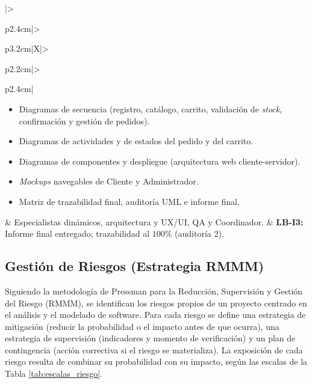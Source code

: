 {\begin{xltabular}{\textwidth}{|>{\raggedright\arraybackslash}p{2.4cm}|>{\raggedright\arraybackslash}p{3.2cm}|X|>{\raggedright\arraybackslash}p{2.2cm}|>{\raggedright\arraybackslash}p{2.4cm}|}
    \begin{itemize}[leftmargin=*, nosep]
        \item Diagramas de secuencia (registro, catálogo, carrito, validación de \textit{stock}, confirmación y gestión de pedidos).
        \item Diagramas de actividades y de estados del pedido y del carrito.
        \item Diagramas de componentes y despliegue (arquitectura web cliente-servidor).
        \item \textit{Mockups} navegables de Cliente y Administrador.
        \item Matriz de trazabilidad final, auditoría UML e informe final.
    \end{itemize} & Especialistas dinámicos, arquitectura y UX/UI, QA y Coordinador. & \textbf{LB-I3:} Informe final entregado; trazabilidad al $100\%$ (auditoría 2). \\
    \hline
\end{xltabular}
}


\subsection{Gestión de Riesgos (Estrategia RMMM)}

Siguiendo la metodología de Pressman para la Reducción, Supervisión y Gestión del Riesgo (RMMM), se identifican los riesgos propios de un proyecto centrado en el análisis y el modelado de software. Para cada riesgo se define una estrategia de mitigación (reducir la probabilidad o el impacto antes de que ocurra), una estrategia de supervisión (indicadores y momento de verificación) y un plan de contingencia (acción correctiva si el riesgo se materializa). La exposición de cada riesgo resulta de combinar su probabilidad con su impacto, según las escalas de la Tabla \ref{tab:escalas_riesgo}.

